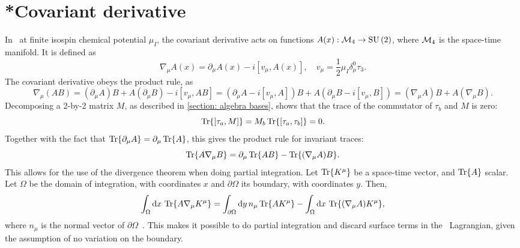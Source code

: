 \section{*Covariant derivative}
\label{appendix: covariant derivative}

In \chpt\ at finite isospin chemical potential $\mu_I$, the covariant derivative acts on functions $A(x): \mathcal{M}_4 \rightarrow \text{SU}\left(2\right)$, where $\mathcal{M}_4$ is the space-time manifold. It is defined as 
\begin{equation}
    \nabla_\mu A(x) = \partial_\mu A(x) - i [v_\mu, A(x)], 
    \quad v_\mu = \frac{1}{2} \mu_I \delta_\mu^0 \tau_3.
\end{equation}
The covariant derivative obeys the product rule, as
\begin{equation*}
    \nabla_\mu (A B) 
    = (\partial_\mu A) B + A (\partial_\mu B) - i [v_\mu, AB]
    = (\partial_\mu A - i [v_\mu, A])B + A(\partial_\mu B- i [v_\mu, B]) 
    = (\nabla_\mu A)B + A (\nabla_\mu B).
\end{equation*}
%
Decomposing a 2-by-2 matrix $M$, as described in \autoref{section: algebra bases}, shows that the trace of the commutator of $\tau_b$ and $M$ is zero:
%
\begin{equation*}
    \Tr{[\tau_a, M]} = M_b\Tr{ [\tau_a, \tau_b]} = 0.
\end{equation*}
%
Together with the fact that $\Tr{\partial_\mu A} = \partial_\mu \Tr{A}$, this gives the product rule for invariant traces:
%
\begin{equation*}
    \Tr{A \nabla_\mu B} = \partial_\mu \Tr{AB} - \Tr{(\nabla_\mu A) B}.
\end{equation*}
%
This allows for the use of the divergence theorem when doing partial integration.
Let $\Tr{K^\mu}$ be a space-time vector, and $\Tr{A}$ scalar. 
Let $\Omega$ be the domain of integration, with coordinates $x$ and $\partial \Omega$ its boundary, with coordinates $y$. Then, 
%
\begin{align*}
    \int_\Omega \dd x \, \Tr{A \nabla_\mu K^\mu} = \int_{\partial\Omega} \dd y\, n_\mu \Tr{A K^\mu} - \int_\Omega \dd x \, \Tr{(\nabla_\mu A) K^\mu},
\end{align*}
%
where $n_\mu$ is the normal vector of $\partial \Omega$~\autocite{carrollSpacetimeGeometryIntroduction2019}.
This makes it possible to do partial integration and discard surface terms in the \chpt\ Lagrangian, given the assumption of no variation on the boundary.
